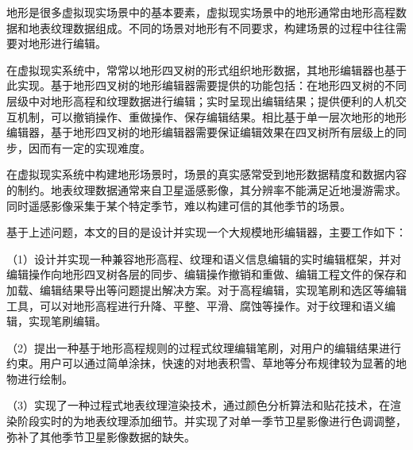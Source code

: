 
\begin{cabstract}
	地形是很多虚拟现实场景中的基本要素，虚拟现实场景中的地形通常由地形高程数据和地表纹理数据组成。不同的场景对地形有不同要求，构建场景的过程中往往需要对地形进行编辑。\par
    在虚拟现实系统中，常常以地形四叉树的形式组织地形数据，其地形编辑器也基于此实现。基于地形四叉树的地形编辑器需要提供的功能包括：在地形四叉树的不同层级中对地形高程和纹理数据进行编辑；实时呈现出编辑结果；提供便利的人机交互机制，可以撤销操作、重做操作、保存编辑结果。相比基于单一层次地形的地形编辑器，基于地形四叉树的地形编辑器需要保证编辑效果在四叉树所有层级上的同步，因而有一定的实现难度。\par
	在虚拟现实系统中构建地形场景时，场景的真实感常受到地形数据精度和数据内容的制约。地表纹理数据通常来自卫星遥感影像，其分辨率不能满足近地漫游需求。同时遥感影像采集于某个特定季节，难以构建可信的其他季节的场景。\par
	基于上述问题，本文的目的是设计并实现一个大规模地形编辑器，主要工作如下：\par
	（1）设计并实现一种兼容地形高程、纹理和语义信息编辑的实时编辑框架，并对编辑操作向地形四叉树各层的同步、编辑操作撤销和重做、编辑工程文件的保存和加载、编辑结果导出等问题提出解决方案。对于高程编辑，实现笔刷和选区等编辑工具，可以对地形高程进行升降、平整、平滑、腐蚀等操作。对于纹理和语义编辑，实现笔刷编辑。\par
	（2）提出一种基于地形高程规则的过程式纹理编辑笔刷，对用户的编辑结果进行约束。用户可以通过简单涂抹，快速的对地表积雪、草地等分布规律较为显著的地物进行绘制。\par
	（3）实现了一种过程式地表纹理渲染技术，通过颜色分析算法和贴花技术，在渲染阶段实时的为地表纹理添加细节。并实现了对单一季节卫星影像进行色调调整，弥补了其他季节卫星影像数据的缺失。\par
	
	
\end{cabstract}
\cleardoublepage
